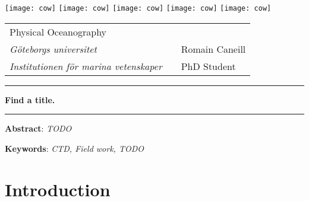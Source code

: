 \documentclass[12pt,a4paper]{article}
\begin{document}
\setlength{\parindent}{0pt}

\thispagestyle{empty}

\texttt{[image: cow]} \hfill
\texttt{[image: cow]} \hfill
\texttt{[image: cow]} \hfill
\texttt{[image: cow]} \hfill
\texttt{[image: cow]}

\vspace{0.5cm}

\begin{tabularx}{\textwidth}{@{} l X l @{} }
{\sc Physical Oceanography} & &  \\
{\it Göteborgs universitet} & & Romain Caneill\\
{\it Institutionen för marina vetenskaper} & & PhD Student
\end{tabularx}

\begin{center}
\vspace{.3cm}

\rule[5pt]{10cm}{0.5pt}
\vspace{10pt}

\textbf{\Large Find a title.}
\vspace{8pt}

\rule{10cm}{0.5pt}

\vspace{.3cm}

\parbox{15cm}{\small
\textbf{Abstract}: \it TODO
} %

\vspace{0.5cm}

\parbox{15cm}{
\textbf{Keywords}: \it CTD, Field work, TODO
} %

\end{center}

\newpage

\setcounter{page}{1}
\setlength\parindent{24pt}

\newpage

\tableofcontents

\newpage

\section{\label{sec_intro}Introduction}
\end{document}
